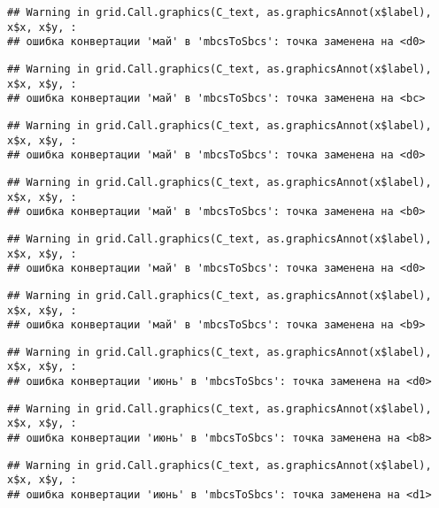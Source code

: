 \documentclass[
]{article}
\begin{document}
\begin{verbatim}
## Warning in grid.Call.graphics(C_text, as.graphicsAnnot(x$label), x$x, x$y, :
## ошибка конвертации 'май' в 'mbcsToSbcs': точка заменена на <d0>
\end{verbatim}

\begin{verbatim}
## Warning in grid.Call.graphics(C_text, as.graphicsAnnot(x$label), x$x, x$y, :
## ошибка конвертации 'май' в 'mbcsToSbcs': точка заменена на <bc>
\end{verbatim}

\begin{verbatim}
## Warning in grid.Call.graphics(C_text, as.graphicsAnnot(x$label), x$x, x$y, :
## ошибка конвертации 'май' в 'mbcsToSbcs': точка заменена на <d0>
\end{verbatim}

\begin{verbatim}
## Warning in grid.Call.graphics(C_text, as.graphicsAnnot(x$label), x$x, x$y, :
## ошибка конвертации 'май' в 'mbcsToSbcs': точка заменена на <b0>
\end{verbatim}

\begin{verbatim}
## Warning in grid.Call.graphics(C_text, as.graphicsAnnot(x$label), x$x, x$y, :
## ошибка конвертации 'май' в 'mbcsToSbcs': точка заменена на <d0>
\end{verbatim}

\begin{verbatim}
## Warning in grid.Call.graphics(C_text, as.graphicsAnnot(x$label), x$x, x$y, :
## ошибка конвертации 'май' в 'mbcsToSbcs': точка заменена на <b9>
\end{verbatim}

\begin{verbatim}
## Warning in grid.Call.graphics(C_text, as.graphicsAnnot(x$label), x$x, x$y, :
## ошибка конвертации 'июнь' в 'mbcsToSbcs': точка заменена на <d0>
\end{verbatim}

\begin{verbatim}
## Warning in grid.Call.graphics(C_text, as.graphicsAnnot(x$label), x$x, x$y, :
## ошибка конвертации 'июнь' в 'mbcsToSbcs': точка заменена на <b8>
\end{verbatim}

\begin{verbatim}
## Warning in grid.Call.graphics(C_text, as.graphicsAnnot(x$label), x$x, x$y, :
## ошибка конвертации 'июнь' в 'mbcsToSbcs': точка заменена на <d1>
\end{verbatim}
\end{document}
